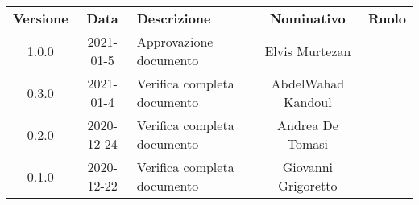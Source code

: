 {
    \renewcommand{\arraystretch}{1.5}
    \centering
    \begin{longtable}{ c c  C{4cm}  c  c }
        \rowcolor{\primaryColor}
        \textcolor{\secondaryColor}{
        \textbf{Versione}}     & \textcolor{\secondaryColor}{\textbf{Data}}       & \textcolor{\secondaryColor}
        {\textbf{Descrizione}} & \textcolor{\secondaryColor}{\textbf{Nominativo}} & \textcolor{\secondaryColor}{\textbf{Ruolo}}                          \\


        1.0.0                  & 2021-01-5                                      & Approvazione documento         & Elvis Murtezan & \responsabile{} \\
        
        0.3.0                  & 2021-01-4                                       & Verifica completa documento    & AbdelWahad Kandoul & \verificatore{} \\
        
        0.2.0                  & 2020-12-24                                       & Verifica completa documento   & Andrea De Tomasi & \verificatore{}    \\
        
        0.1.0                  & 2020-12-22                                       & Verifica completa documento        & Giovanni Grigoretto & \verificatore{}    \\
    \end{longtable}
}